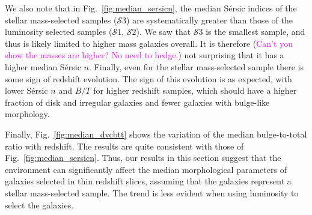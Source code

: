 \documentclass[twocolumn,useAMS,usenatbib]{mn2e}
\newcommand{\claire}[1]{{\textcolor{magenta}{#1}}}
\newcommand{\sersic}{S\'{e}rsic }
\newcommand{\s}{\ensuremath{\mathcal{S}}}
\begin{document}
We also note that in Fig.~\ref{fig:median_sersicn}, the median \sersic
indices of the stellar mass-selected samples (\s$3$) are
systematically greater than those of the luminosity selected samples
(\s$1$, \s$2$).  We saw that \s3 is the smallest sample, and thus is
likely limited to higher mass galaxies overall.  It is therefore (\claire{Can't you show the masses are higher? No need to hedge.}) not
surprising that it has a higher median \sersic $n$.  Finally, even for
the stellar mass-selected sample there is some sign of redshift
evolution.  The sign of this evolution is as expected, with lower
\sersic $n$ and $B/T$ for higher redshift samples, which should have a
higher fraction of disk and irregular galaxies and fewer galaxies with
bulge-like morphology.
 
Finally, Fig.~\ref{fig:median_dvcbtt} shows the variation of the median
bulge-to-total ratio with redshift. The results are quite consistent
with those of Fig.~\ref{fig:median_sersicn}. 
Thus, our results in this section suggest that the 
environment can significantly affect the median morphological
parameters of galaxies selected in thin redshift
slices, assuming that the galaxies represent a stellar mass-selected
sample.  The trend is less evident when using luminosity to select the
galaxies.
\end{document}
